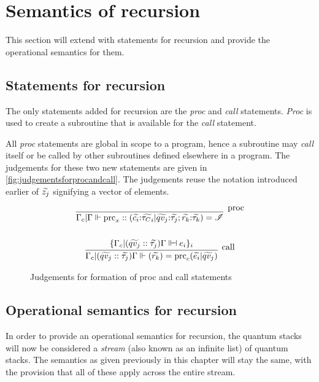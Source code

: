 \section{Semantics of recursion}\label{sec:semanticsiteration}
This section will extend \lqpl{} with statements for recursion and provide
the operational semantics for them. 

\subsection{Statements for recursion}
The only statements added for recursion are  the \emph{proc} and
\emph{call} statements. \emph{Proc} is used to create a 
subroutine that is available for the \emph{call} statement.

All \emph{proc} statements are global in scope to a program, hence
a subroutine may \emph{call} itself or be called by other subroutines 
defined elsewhere in a program. The judgements for these two new statements
are given in \vref{fig:judgementsforprocandcall}. The judgements 
reuse the notation introduced earlier of 
$\widetilde{z_j}$ signifying a vector of elements.


\begin{figure}[htbp]
\[
\begin{gathered}
\infer[{\raisebox{2ex}{proc}}]
   {\Gamma_c|\Gamma \ientail 
             \text{prc}_x ::(\qvec{c_i}{:}\qvec{{\tcls}_i} | 
                \qvec{qv_j}{:}\qvec{\tau_j} ; 
                 \qvec{r_k}{:}\qvec{\tau_k}) = \qins}
   {}\\ 
\\
\infer[{\raisebox{2ex}{call}}]
   {\Gamma_c | (\qvec{qv_j}::\qvec{\tau_j})\Gamma \ientail 
        (\qvec{r_k}) = \text{prc}_c(\qvec{e_i} | \qvec{qv_j})}
   {\{\Gamma_c | (\qvec{qv_j}::\qvec{\tau_j})\Gamma \eentail e_i\}_i}
\end{gathered}
\]
\caption{Judgements for formation of proc and call statements}\label{fig:judgementsforprocandcall}
\end{figure}


\subsection{Operational semantics for recursion}
In order to provide an operational semantics for recursion, the
 quantum stacks will now be considered a \emph{stream} (also known as an
infinite list) of quantum stacks. The semantics as given previously in
this chapter will stay the same, with the
provision that all of these apply across the entire stream. 

